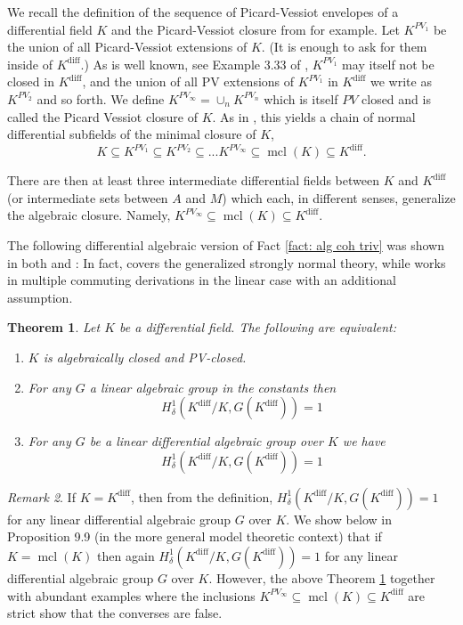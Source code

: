 \documentclass{amsart}
\newtheorem{theorem}{Theorem}[section]
\theoremstyle{definition}
\theoremstyle{remark}
\newtheorem{remark}[theorem]{Remark}
\numberwithin{equation}{section}
\def \diff {\operatorname{diff}}
\def \mcl {\operatorname{mcl}}
\begin{document}
We recall the definition of the sequence of Picard-Vessiot envelopes of a differential field $K$ and the Picard-Vessiot closure from \cite{meretzky2026galoistheoryautomorphismgroups} for example. Let $K^{PV_1}$ be the union of all Picard-Vessiot extensions of $K$. (It is enough to ask for them inside of $K^{\diff}$.) As is well known, see Example 3.33 of \cite{magid1994lectures},  $K^{PV_1}$ may itself not be closed in $K^{\diff}$, and the union of all PV extensions of $K^{PV_1}$ in $K^{\diff}$ we write as $K^{PV_2}$ and so forth. We define $K^{PV_\infty}=\cup_n K^{PV_n}$ which is itself $PV$ closed and is called the Picard Vessiot closure of $K$. As in  \cite{meretzky2026galoistheoryautomorphismgroups}, this yields a chain of normal differential subfields of the minimal closure of $K$, $$K \subseteq K^{PV_1} \subseteq K^{PV_2} \subseteq ... K^{PV_\infty}\subseteq \mcl(K)\subseteq K^{\diff}.$$

There are then at least three intermediate differential fields between $K$ and $K^{\diff}$ (or intermediate sets between $A$ and $M$) which each, in different senses, generalize the algebraic closure. Namely, $K^{PV_\infty}\subseteq \mcl(K)\subseteq K^{\diff}$. 

The following differential algebraic version of Fact \ref{fact: alg coh triv} was shown in both \cite{PILLAY2017809} and \cite{Minchenko_2019}: In fact, \cite{PILLAY2017809}  covers the generalized strongly normal theory, while \cite{Minchenko_2019} works in multiple commuting derivations in the linear case with an additional assumption.  

\begin{theorem}\label{thm: pv closed}\cite{PILLAY2017809}
    Let $K$ be a differential field. The following are equivalent:
    
    \begin{enumerate}
        \item $K$ is algebraically closed and PV-closed. 
        \item For any $G$ a linear algebraic group in the constants then $$H^1_{\delta}(K^{\diff}/K,G(K^{\diff})) = 1$$
        \item For any $G$ be a linear differential algebraic group over $K$ we have $$H^1_{\delta}(K^{\diff}/K,G(K^{\diff})) = 1$$
    \end{enumerate}
\end{theorem}

\begin{remark}
    If $K = K^{\diff}$, then from the definition,  $H^1_{\delta}(K^{\diff}/K,G(K^{\diff})) = 1$ for any linear differential algebraic group $G$ over $K$. We show below in Proposition 9.9 (in the more general model theoretic context) that if $K=\mcl(K)$ then again $H^1_{\delta}(K^{\diff}/K,G(K^{\diff})) = 1$ for any linear differential algebraic group $G$ over $K$. However, the above Theorem \ref{thm: pv closed} together with abundant examples where the inclusions $K^{PV_\infty}\subseteq \mcl(K)\subseteq K^{\diff}$ are strict show that the converses are false.
\end{remark}
\end{document}
